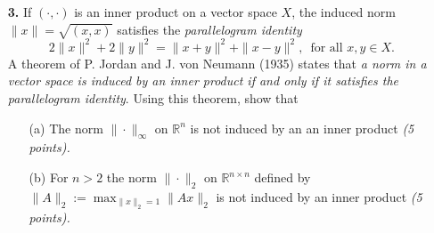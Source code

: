 \documentclass[10pt]{report}
\begin{document}
\begin{enumerate}
\vspace{0.1cm} 
\item[\textbf{3.}] If $(\cdot,\cdot)$ is an inner product on a vector  space $X$, the induced norm $\|x\|= \sqrt{(x, x)}$ satisfies the \textit{parallelogram identity}
\[2 \|x\|^2 + 2\|y\|^2 = \|x+y\|^2 + \|x-y\|^2, \, \text{ for all } x,y \in X.\]
A theorem of P. Jordan and J. von Neumann (1935) states that \textit{a norm in a vector space is induced by an inner product if and only if it satisfies the parallelogram identity}. Using this theorem, show that
\begin{enumerate}
  \item[(a)] The norm $\|\cdot\|_{\infty}$ on $\mathbb{R}^n$ is not induced by an an inner product \textit{(5 points).}
  \item[(b)] For $n>2$ the norm $\|\cdot\|_{2}$ on $\mathbb{R}^{n\times n}$ defined by $\|A\|_2:= \max_{\|x\|_2=1}\|Ax\|_2$ is not induced by an inner product  \textit{(5 points).}
\end{enumerate}







\end{enumerate}
\end{document}
